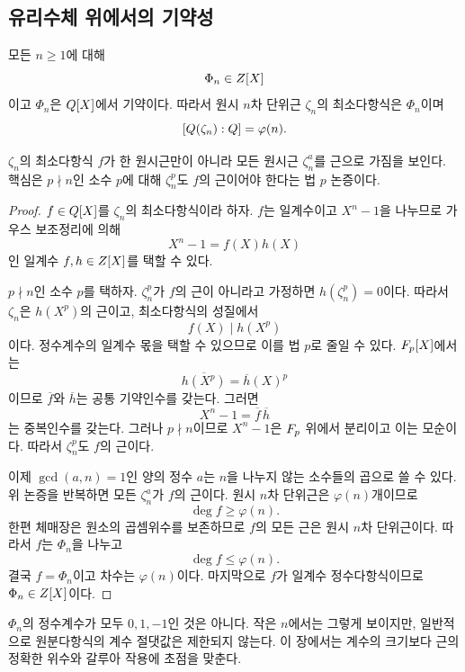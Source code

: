 \subsection{유리수체 위에서의 기약성}

\begin{theorem}
\label{thm:cyclotomic-irreducible-Q}
모든 $n\ge1$에 대해
\[
  \Phi_n\in Z[X]
\]
이고 $\Phi_n$은 $Q[X]$에서 기약이다. 따라서 원시 $n$차 단위근 $\zeta_n$의 최소다항식은 $\Phi_n$이며
\[
  [Q(\zeta_n):Q]=\varphi(n).
\]
\end{theorem}

\begin{proofidea}
$\zeta_n$의 최소다항식 $f$가 한 원시근만이 아니라 모든 원시근 $\zeta_n^a$를 근으로 가짐을 보인다. 핵심은 $p\nmid n$인 소수 $p$에 대해 $\zeta_n^p$도 $f$의 근이어야 한다는 법 $p$ 논증이다.
\end{proofidea}

\begin{proof}
$f\in Q[X]$를 $\zeta_n$의 최소다항식이라 하자. $f$는 일계수이고 $X^n-1$을 나누므로 가우스 보조정리에 의해
\[
  X^n-1=f(X)h(X)
\]
인 일계수 $f,h\in Z[X]$를 택할 수 있다.

$p\nmid n$인 소수 $p$를 택하자. $\zeta_n^p$가 $f$의 근이 아니라고 가정하면 $h(\zeta_n^p)=0$이다. 따라서 $\zeta_n$은 $h(X^p)$의 근이고, 최소다항식의 성질에서
\[
  f(X)\mid h(X^p)
\]
이다. 정수계수의 일계수 몫을 택할 수 있으므로 이를 법 $p$로 줄일 수 있다. $F_p[X]$에서는
\[
  \overline{h(X^p)}=\overline h(X)^p
\]
이므로 $\overline f$와 $\overline h$는 공통 기약인수를 갖는다. 그러면
\[
  X^n-1=\overline f\,\overline h
\]
는 중복인수를 갖는다. 그러나 $p\nmid n$이므로 $X^n-1$은 $F_p$ 위에서 분리이고 이는 모순이다. 따라서 $\zeta_n^p$도 $f$의 근이다.

이제 $\gcd(a,n)=1$인 양의 정수 $a$는 $n$을 나누지 않는 소수들의 곱으로 쓸 수 있다. 위 논증을 반복하면 모든 $\zeta_n^a$가 $f$의 근이다. 원시 $n$차 단위근은 $\varphi(n)$개이므로
\[
  \deg f\ge\varphi(n).
\]
한편 체매장은 원소의 곱셈위수를 보존하므로 $f$의 모든 근은 원시 $n$차 단위근이다. 따라서 $f$는 $\Phi_n$을 나누고
\[
  \deg f\le\varphi(n).
\]
결국 $f=\Phi_n$이고 차수는 $\varphi(n)$이다. 마지막으로 $f$가 일계수 정수다항식이므로 $\Phi_n\in Z[X]$이다.
\end{proof}

\begin{remark}
$\Phi_n$의 정수계수가 모두 $0,1,-1$인 것은 아니다. 작은 $n$에서는 그렇게 보이지만, 일반적으로 원분다항식의 계수 절댓값은 제한되지 않는다. 이 장에서는 계수의 크기보다 근의 정확한 위수와 갈루아 작용에 초점을 맞춘다.
\end{remark}

